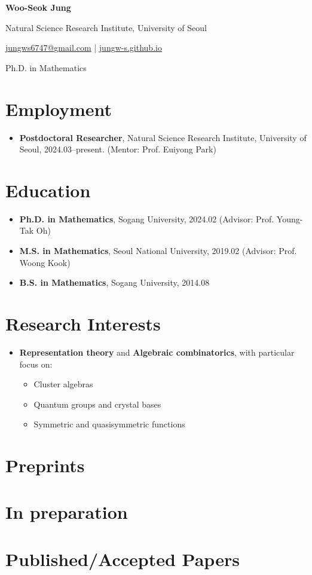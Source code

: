 \documentclass[11pt,a4paper]{article}
\newcommand{\cvsection}[1]{\Needspace{4\baselineskip}\section*{#1}}
\begin{document}
\begin{center}
  {\Large\bfseries Woo-Seok Jung}\par
  \vspace{5pt}
  Natural Science Research Institute, University of Seoul\par
  \href{mailto:jungws6747@gmail.com}{jungws6747@gmail.com}
  \enspace|\enspace
  \href{https://jungw-s.github.io/}{jungw-s.github.io}\par
  Ph.D. in Mathematics
\end{center}
\vspace{8pt}

\cvsection{Employment}
\begin{itemize}
\item \textbf{Postdoctoral Researcher}, Natural Science Research Institute,
  University of Seoul, \mbox{2024.03--present}.
  (Mentor: Prof. Euiyong Park)
\end{itemize}

\cvsection{Education}
\begin{itemize}
\item \textbf{Ph.D. in Mathematics}, Sogang University, 2024.02
  (Advisor: Prof. Young-Tak Oh)
\item \textbf{M.S. in Mathematics}, Seoul National University, 2019.02
  (Advisor: Prof. Woong Kook)
\item \textbf{B.S. in Mathematics}, Sogang University, 2014.08
\end{itemize}

\cvsection{Research Interests}
\begin{itemize}
\item \textbf{Representation theory} and \textbf{Algebraic combinatorics}, with particular focus on:
  \begin{itemize}
  \item Cluster algebras
  \item Quantum groups and crystal bases
  \item Symmetric and quasisymmetric functions
  \end{itemize}
\end{itemize}

\cvsection{Preprints}


\cvsection{In preparation}


\cvsection{Published/Accepted Papers}

\end{document}
